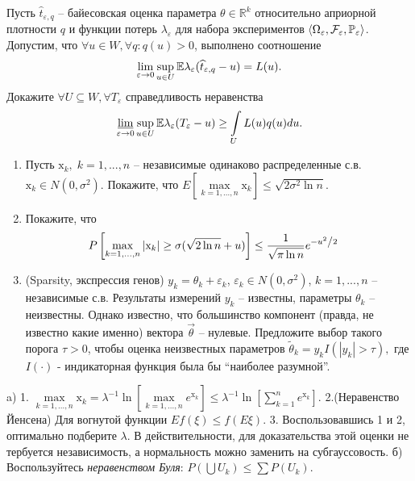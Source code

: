 \begin{problem}
Пусть $\widehat{t}_{\varepsilon, q}$ -- байесовская оценка параметра $\theta \in \mathbb{R}^k$ относительно априорной плотности $q$ и функции потерь $\lambda_\varepsilon$ для набора экспериментов  $\langle \Omega_\varepsilon, \mathcal{F}_\varepsilon, \mathrm{{\mathbb P}}_\varepsilon \rangle$. Допустим, что $\forall u \in W,  \forall q: q(u) > 0$, 
выполнено соотношение
\[
\lim \limits_{\varepsilon \to 0} \sup \limits_{u \in U} \mathrm{{\mathbb E}} \lambda_\varepsilon (\widehat{t}_{\varepsilon, q} - u) = L(u).
\] 
Докажите $\forall U \subseteq W,  \forall T_\varepsilon$ справедливость неравенства
\[
\mathop{\underline{\lim}} \limits_{\varepsilon \to 0}  
\sup \limits_{u \in U} \mathrm{{\mathbb E}} \lambda_\varepsilon (T_\varepsilon - u) \geq \int \limits_{U} L(u) q(u)du.
\]
\end{problem}

\begin{problem}
\begin{enumerate}
\item Пусть $\mbox{x}_k ,\;k=1,...,n$ -- 
независимые одинаково распределенные с.в. $\mbox{x}_k \in N\left( {0,\sigma^2} \right)$. Покажите, что $E\left[ {\mathop {\max }\limits_{k=1,...,n}\mbox{x}_k } \right]\le \sqrt {2\sigma ^2\ln n} $.

\item Покажите, что
\[
P\left[ {\mathop {\max }\limits_{k=1,...,n} \left| {\mbox{x}_k } \right|\ge 
\sigma (\sqrt {2\ln n} +u) } \right]\le \frac{1}{\sqrt {\pi \ln n} }e^{-{u^2} 
\mathord{\left/ {\vphantom {{u^2} 2}} \right. \kern-\nulldelimiterspace} 2}\quad\]

\item (Sparsity, экспрессия генов) $y_k =\theta _k +\varepsilon _k $, 
$\varepsilon _k \in N\left( {0,\sigma ^2} \right)$, $k=1,...,n$ -- 
независимые с.в. Результаты измерений $y_k $ -- известны, параметры $\theta 
_k $ -- неизвестны. Однако известно, что большинство компонент (правда, не 
известно какие именно) вектора $\vec {\theta }$ -- нулевые. Предложите выбор 
такого порога $\tau >0$, чтобы оценка неизвестных параметров
 $\tilde {\theta }_k =y_k I\left( {\left| {y_k } \right|>\tau } \right),$ где 
$I(\cdot)$ - индикаторная функция была бы ``наиболее разумной''.

\end{enumerate}
 \end{problem}
 
\begin{ordre}
a) 1. $\mathop {\max }\limits_{k=1,...,n}\mbox{x}_k =\lambda ^{-1}\ln \left[ {\mathop {\max }\limits_{k=1,...,n} e^{\mbox{x}_k }} \right]\le \lambda ^{-1}\ln \left[ {\sum\limits_{k=1}^n {e^{\mbox{x}_k }} } \right]$. 2.(Неравенство Йенсена) Для вогнутой 
функции $Ef\left( \xi \right)\le f\left( {E\xi } \right)$. 3. 
Воспользовавшись 1 и 2, оптимально подберите $\lambda $. 
В действительности, для доказательства этой оценки не тербуется независимость, а нормальность можно заменить на субгауссовость.
б) Воспользуйтесь 
\textit{неравенством Буля}: $P\left( {\bigcup {U_k } } \right)\le \sum {P\left( {U_k } \right)} $. 

\end{ordre}
 
